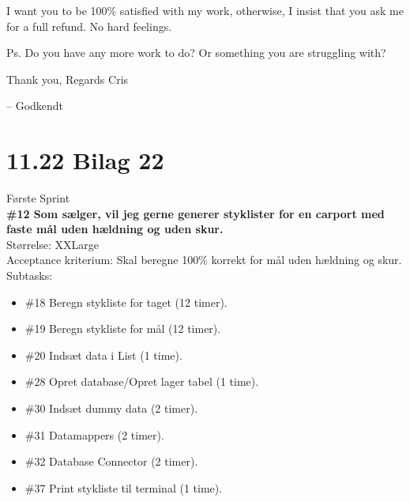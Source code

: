 \documentclass[11pt]{report}
\begin{document}
\noindent I want you to be 100\% satisfied with my work, otherwise, I insist that you ask me for a full refund. No hard feelings.

\noindent Ps. Do you have any more work to do? Or something you are struggling with?

\noindent Thank you, Regards Cris

\noindent -- Godkendt

\newpage
\section*{11.22 Bilag 22}
Første Sprint\\
\textbf{\#12 Som sælger, vil jeg gerne generer styklister for en carport med faste mål uden hældning og uden skur.}\\
Størrelse: XXLarge\\
Acceptance kriterium: Skal beregne 100\% korrekt for mål uden hældning og skur.\\
Subtasks:
\begin{itemize}
\item \#18 Beregn stykliste for taget (12 timer).
\item \#19 Beregn stykliste for mål (12 timer).
\item \#20 Indsæt data i List (1 time).
\item \#28 Opret database/Opret lager tabel (1 time).
\item \#30 Indsæt dummy data (2 timer).
\item \#31 Datamappers (2 timer).
\item \#32 Database Connector (2 timer).
\item \#37 Print stykliste til terminal (1 time).
\end{itemize}
\leavevmode
\end{document}
